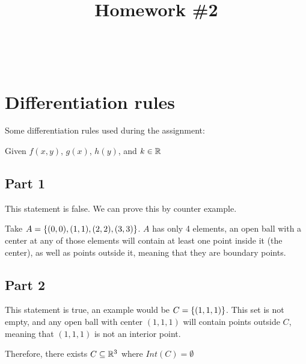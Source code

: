 \documentclass[12pt]{article} %
\title{
    \vspace{2in}
        \textmd{\textbf{\classTitle}}\\
    \vspace{1in}
    \textmd{\textbf{Homework \#2}}\\
    \vspace{1in}
}
\author{
    \hmwkAuthorName\\
    \hmwkStudentnum\\
}
\date{}
\begin{document}
\maketitle

\pagebreak

\section*{Differentiation rules}

Some differentiation rules used during the assignment:

Given $f(x, y)$, $g(x)$, $h(y)$, and $k \in \mathbb{R}$


\pagebreak

\begin{homeworkProblem}

    \subsection*{Part 1}

    This statement is false. We can prove this by counter example.

    Take $A = \left\{(0, 0), (1, 1), (2, 2), (3, 3)\right\}$. $A$ has only 4 elements, an open ball with a center at any of those elements
    will contain at least one point inside it (the center), as well as points outside it, meaning that they are boundary points.

    \subsection*{Part 2}

    This statement is true, an example would be $C = \left\{(1, 1, 1)\right\}$. This set is not empty, and any open ball with center $(1, 1, 1)$ will contain points outside $C$, meaning that $(1, 1, 1)$ is not an interior point.

    Therefore, there exists $C \subseteq \mathbb{R}^3$ where $Int(C) = \emptyset$

\end{homeworkProblem}
\pagebreak
\end{document}
